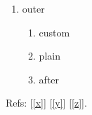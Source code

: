 \documentclass{article}
\begin{document}
\begin{enumerate}
\item outer
  \begin{enumerate}
  \item[(X)] custom\label{x}
  \item plain\label{y}
  \item[(Z)] after\label{z}
  \end{enumerate}
\end{enumerate}
Refs: [\ref{x}] [\ref{y}] [\ref{z}].
\end{document}
